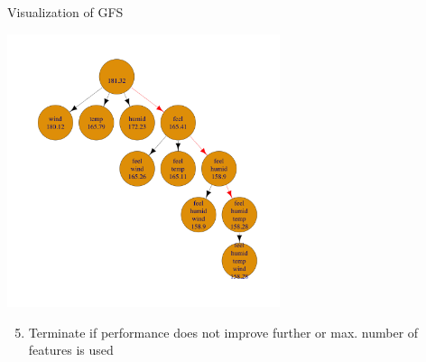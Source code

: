 \documentclass[11pt,compress,t,notes=noshow, xcolor=table]{beamer}
\begin{document}
\begin{frame}[noframenumbering]{Visualization of GFS}
    \begin{center}
      \includegraphics[width = 0.6\textwidth]{figure/fs-wrappers-powerset-tree-4.png}
      \end{center}
      \vspace{-0.2cm}
 \begin{enumerate}
     \setcounter{enumi}{4}
     \item Terminate if performance does not improve further or max. number of features is used
 \end{enumerate}
\end{frame}

\end{document}
